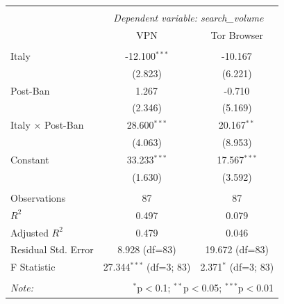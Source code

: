 \begin{table}[!htbp] \centering
\begin{tabular}{@{\extracolsep{5pt}}lcc}
\\[-1.8ex]\hline
\hline \\[-1.8ex]
& \multicolumn{2}{c}{\textit{Dependent variable: search_volume}} \
\cr \cline{2-3}
\\[-1.8ex] & \multicolumn{1}{c}{VPN} & \multicolumn{1}{c}{Tor Browser}  \\
\hline \\[-1.8ex]
 Italy & -12.100$^{***}$ & -10.167$^{}$ \\
& (2.823) & (6.221) \\
 Post-Ban & 1.267$^{}$ & -0.710$^{}$ \\
& (2.346) & (5.169) \\
 Italy × Post-Ban & 28.600$^{***}$ & 20.167$^{**}$ \\
& (4.063) & (8.953) \\
 Constant & 33.233$^{***}$ & 17.567$^{***}$ \\
& (1.630) & (3.592) \\
\hline \\[-1.8ex]
 Observations & 87 & 87 \\
 $R^2$ & 0.497 & 0.079 \\
 Adjusted $R^2$ & 0.479 & 0.046 \\
 Residual Std. Error & 8.928 (df=83) & 19.672 (df=83) \\
 F Statistic & 27.344$^{***}$ (df=3; 83) & 2.371$^{*}$ (df=3; 83) \\
\hline
\hline \\[-1.8ex]
\textit{Note:} & \multicolumn{2}{r}{$^{*}$p$<$0.1; $^{**}$p$<$0.05; $^{***}$p$<$0.01} \\
\end{tabular}
\end{table}